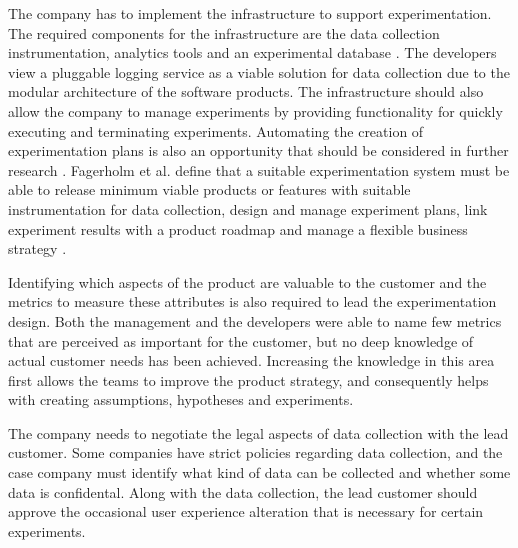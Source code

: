 \documentclass[english]{tktltiki2}
\theoremstyle{definition}
\theoremstyle{remark}
\begin{document}
The company has to implement the infrastructure to support experimentation. The required components for the infrastructure are the data collection instrumentation, analytics tools and an experimental database \cite{kohavi2007practical, fagerholm2014building}. The developers view a pluggable logging service as a viable solution for data collection due to the modular architecture of the software products. The infrastructure should also allow the company to manage experiments by providing functionality for quickly executing and terminating experiments. Automating the creation of experimentation plans is also an opportunity that should be considered in further research \cite{fagerholm2014building}. Fagerholm et al. define that a suitable experimentation system must be able to release minimum viable products or features with suitable instrumentation for data collection, design and manage experiment plans, link experiment results with a product roadmap and manage a flexible business strategy \cite{fagerholm2014building}.

Identifying which aspects of the product are valuable to the customer and the metrics to measure these attributes is also required to lead the experimentation design. Both the management and the developers were able to name few metrics that are perceived as important for the customer, but no deep knowledge of actual customer needs has been achieved. Increasing the knowledge in this area first allows the teams to improve the product strategy, and consequently helps with creating assumptions, hypotheses and experiments. 

The company needs to negotiate the legal aspects of data collection with the lead customer. Some companies have strict policies regarding data collection, and the case company must identify what kind of data can be collected and whether some data is confidental. Along with the data collection, the lead customer should approve the occasional user experience alteration that is necessary for certain experiments. 
\end{document}
